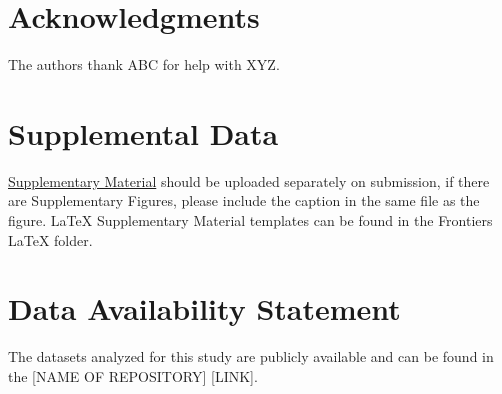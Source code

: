\documentclass[utf8]{FrontiersinHarvard}
\begin{document}
\section*{Acknowledgments}
The authors thank ABC for help with XYZ.

\section*{Supplemental Data}
 \href{http://home.frontiersin.org/about/author-guidelines#SupplementaryMaterial}{Supplementary Material} should be uploaded separately on submission, if there are Supplementary Figures, please include the caption in the same file as the figure. LaTeX Supplementary Material templates can be found in the Frontiers LaTeX folder.

\section*{Data Availability Statement} \label{s:data_availability}
The datasets analyzed for this study are publicly available and can be found in the [NAME OF REPOSITORY] [LINK].



\end{document}
